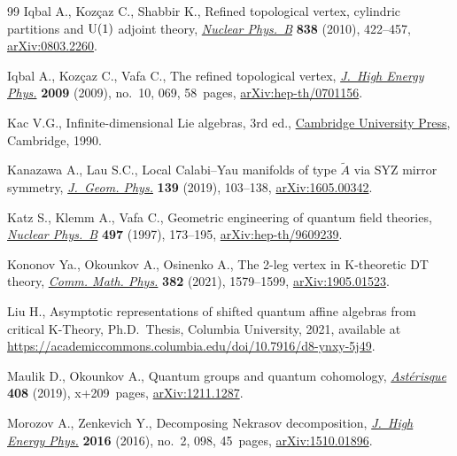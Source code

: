 \documentclass[10pt,a4paper]{amsart}
\numberwithin{equation}{section}
\renewcommand{\tilde}[1]{\widetilde{#1}}
\begin{document}
\begin{thebibliography}{99}
Iqbal A., Koz\c{c}az C., Shabbir K., Refined topological vertex, cylindric
 partitions and {$\rm U(1)$} adjoint theory, \href{https://doi.org/10.1016/j.nuclphysb.2010.06.010}{\textit{Nuclear Phys.~B}}
 \textbf{838} (2010), 422--457, \href{https://arxiv.org/abs/0803.2260}{arXiv:0803.2260}.

Iqbal A., Koz\c{c}az C., Vafa C., The refined topological vertex,
 \href{https://doi.org/10.1088/1126-6708/2009/10/069}{\textit{J.~High Energy Phys.}} \textbf{2009} (2009), no.~10, 069, 58~pages,
 \href{https://arxiv.org/abs/hep-th/0701156}{arXiv:hep-th/0701156}.

Kac V.G., Infinite-dimensional {L}ie algebras, 3rd ed., \href{https://doi.org/10.1017/CBO9780511626234}{Cambridge University
 Press}, Cambridge, 1990.

Kanazawa A., Lau S.C., Local {C}alabi--{Y}au manifolds of type $\tilde{A}$ via
 {SYZ} mirror symmetry, \href{https://doi.org/10.1016/j.geomphys.2018.12.015}{\textit{J.~Geom. Phys.}} \textbf{139} (2019), 103--138,
 \href{https://arxiv.org/abs/1605.00342}{arXiv:1605.00342}.

Katz S., Klemm A., Vafa C., Geometric engineering of quantum field theories,
 \href{https://doi.org/10.1016/S0550-3213(97)00282-4}{\textit{Nuclear Phys.~B}} \textbf{497} (1997), 173--195,
 \href{https://arxiv.org/abs/hep-th/9609239}{arXiv:hep-th/9609239}.

Kononov Ya., Okounkov A., Osinenko A., The 2-leg vertex in {K}-theoretic {DT}
 theory, \href{https://doi.org/10.1007/s00220-021-03936-z}{\textit{Comm. Math. Phys.}} \textbf{382} (2021), 1579--1599,
 \href{https://arxiv.org/abs/1905.01523}{arXiv:1905.01523}.

Liu H., Asymptotic representations of shifted quantum affine algebras from
 critical {K}-Theory, Ph.D.~Thesis, {C}olumbia University, 2021, available at
 \url{https://academiccommons.columbia.edu/doi/10.7916/d8-ynxy-5j49}.

Maulik D., Okounkov A., Quantum groups and quantum cohomology,
 \href{https://doi.org/10.24033/ast.1074}{\textit{Ast\'erisque}} \textbf{408} (2019), x+209~pages, \href{https://arxiv.org/abs/1211.1287}{arXiv:1211.1287}.

Morozov A., Zenkevich Y., Decomposing {N}ekrasov decomposition, \href{https://doi.org/10.1007/JHEP02(2016)098}{\textit{J.~High
 Energy Phys.}} \textbf{2016} (2016), no.~2, 098, 45~pages,
 \href{https://arxiv.org/abs/1510.01896}{arXiv:1510.01896}.


\end{thebibliography}
\end{document}
